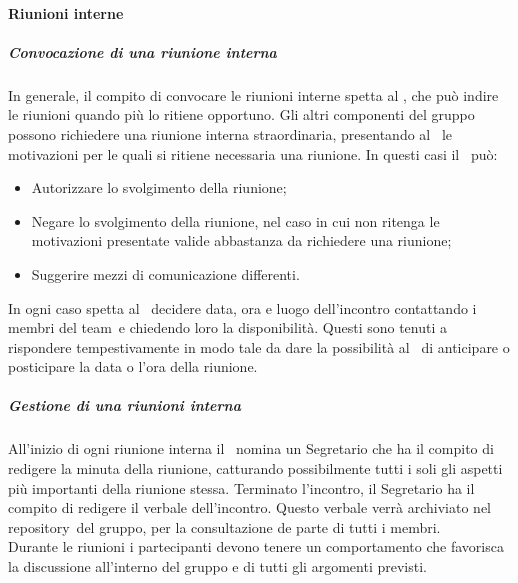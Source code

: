 \documentclass[../NormeProgetto.tex]{subfiles}
\begin{document}
			\paragraph{Riunioni interne}
			\subparagraph{Convocazione di una riunione interna}
			In generale, il compito di convocare le riunioni interne spetta al \responsabilediprogetto, che può indire le riunioni quando più lo ritiene opportuno. Gli altri componenti del gruppo possono richiedere una riunione interna straordinaria, presentando al \responsabilediprogetto\ le motivazioni per le quali si ritiene necessaria una riunione. In questi casi il \responsabilediprogetto\ può:
			\begin{itemize}
			\item Autorizzare lo svolgimento della riunione;
			\item Negare lo svolgimento della riunione, nel caso in cui non ritenga le motivazioni presentate valide abbastanza da richiedere una riunione;
			\item Suggerire mezzi di comunicazione differenti.
			\end{itemize}
			In ogni caso spetta al \responsabilediprogetto\ decidere data, ora e luogo dell'incontro contattando i membri del team\g\ e chiedendo loro la disponibilità. Questi sono tenuti a rispondere tempestivamente in modo tale da dare la possibilità al \responsabilediprogetto\ di anticipare o posticipare la data o l'ora della riunione.
			\subparagraph{Gestione di una riunioni interna}
			All'inizio di ogni riunione interna il \responsabilediprogetto\ nomina un Segretario che ha il compito di redigere la minuta della riunione, catturando possibilmente tutti i soli gli aspetti più importanti della riunione stessa. Terminato l'incontro, il Segretario ha il compito di redigere il verbale dell'incontro. Questo verbale verrà archiviato nel repository\g\ del gruppo, per la consultazione de parte di tutti i membri. \\ Durante le riunioni i partecipanti devono tenere un comportamento che favorisca la discussione all'interno del gruppo e di tutti gli argomenti previsti. 
\end{document}
